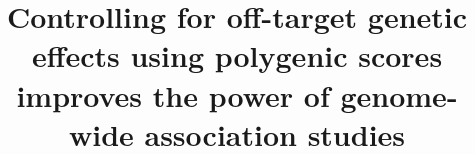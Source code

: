 \documentclass[doublespacing]{bmcart}
\begin{document}
\begin{frontmatter}

\begin{fmbox}


\title{Controlling for off-target genetic effects using polygenic scores improves the power of genome-wide association studies}

\author[
]{ }
\author[
]{ }

\author[
   addressref={aff1},                   %
   corref={aff1},                       %
   email={cathal.seoighe@nuigalway.ie}   %
]{ }






\address[id=aff1]{%
  , %
  ,                     %
  ,                              %
}


\end{fmbox}
\end{frontmatter}
\end{document}
